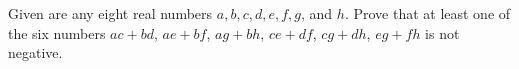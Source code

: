Given are any eight real numbers $a, b, c, d, e, f, g$, and $h$. Prove that at least one of the six numbers $ac + bd$, $ae + bf$, $ag + bh$, $ce + df$, $cg + dh$, $eg + fh$ is not negative.
